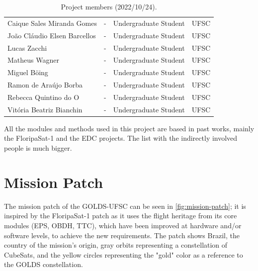 \begin{table}[!htb]
\begin{tabular}{lllc}
        Caique Sales Miranda Gomes          & -         & Undergraduate Student & UFSC \\
        João Cláudio Elsen Barcellos        & -         & Undergraduate Student & UFSC \\
        Lucas Zacchi                        & -         & Undergraduate Student & UFSC \\
        Matheus Wagner                      & -         & Undergraduate Student & UFSC \\
        Miguel Böing                        & -         & Undergraduate Student & UFSC \\
        Ramon de Araújo Borba               & -         & Undergraduate Student & UFSC \\
        Rebecca Quintino do O               & -         & Undergraduate Student & UFSC \\
        Vitória Beatriz Bianchin            & -         & Undergraduate Student & UFSC \\
        \bottomrule[1.5pt]
    \end{tabular}
    \caption{Project members (2022/10/24).}
    \label{tab:team-members}
\end{table}

All the modules and methods used in this project are based in past works, mainly the FloripaSat-1 and the EDC projects. The list with the indirectly involved people is much bigger.

\section{Mission Patch}

The mission patch of the GOLDS-UFSC can be seen in \autoref{fig:mission-patch}; it is inspired by the FloripaSat-1 patch \cite{floripasat} as it uses the flight heritage from its core modules (EPS, OBDH, TTC), which have been improved at hardware and/or software levels, to achieve the new requirements. The patch shows Brazil, the country of the mission's origin, gray orbits representing a constellation of CubeSats, and the yellow circles representing the "gold" color as a reference to the GOLDS constellation.

